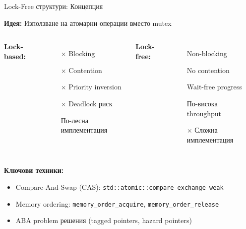 \documentclass[aspectratio=169]{beamer}
\begin{document}
\begin{frame}{Lock-Free структури: Концепция}

\textbf{Идея:} Използване на атомарни операции вместо mutex

\begin{columns}
\textbf{Lock-based:}
\begin{itemize}
    \item[$\times$] Blocking
    \item[$\times$] Contention
    \item[$\times$] Priority inversion
    \item[$\times$] Deadlock риск
    \item[\checkmark] По-лесна имплементация
\end{itemize}

\textbf{Lock-free:}
\begin{itemize}
    \item[\checkmark] Non-blocking
    \item[\checkmark] No contention
    \item[\checkmark] Wait-free progress
    \item[\checkmark] По-висока throughput
    \item[$\times$] Сложна имплементация
\end{itemize}
\end{columns}

\vspace{0.5cm}

\textbf{Ключови техники:}
\begin{itemize}
    \item Compare-And-Swap (CAS): \texttt{std::atomic::compare\_exchange\_weak}
    \item Memory ordering: \texttt{memory\_order\_acquire}, \texttt{memory\_order\_release}
    \item ABA problem решения (tagged pointers, hazard pointers)
\end{itemize}
\end{frame}
\end{document}
